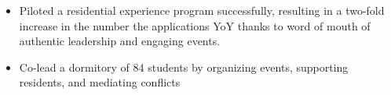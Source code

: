 \documentclass[letterpaper]{article}
\begin{document}


\begin{itemize} \itemsep 1pt
    \item Piloted a residential experience program successfully, resulting in a two-fold increase in the number the applications YoY thanks to word of mouth of authentic leadership and engaging events.
	\item Co-lead a dormitory of 84 students by organizing events, supporting residents, and mediating conflicts
\end{itemize}


\end{document}
